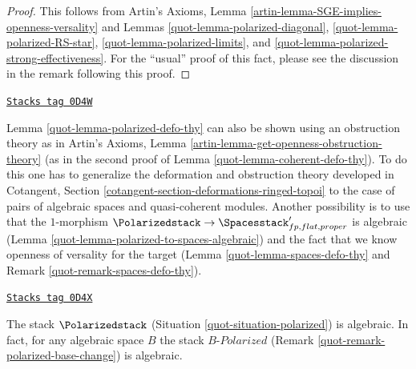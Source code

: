 \begin{proof}

This follows from
Artin's Axioms, Lemma \ref{artin-lemma-SGE-implies-openness-versality}
and Lemmas \ref{quot-lemma-polarized-diagonal},
\ref{quot-lemma-polarized-RS-star},
\ref{quot-lemma-polarized-limits}, and
\ref{quot-lemma-polarized-strong-effectiveness}.
For the ``usual'' proof of this fact, please see the discussion
in the remark following this proof.
\end{proof}

\begin{remark}
\label{quot-remark-polarized-defo-thy}
\href{https://stacks.math.columbia.edu/tag/0D4W}{\texttt{Stacks tag 0D4W}}

Lemma \ref{quot-lemma-polarized-defo-thy} can also be shown
using an obstruction theory as in
Artin's Axioms, Lemma \ref{artin-lemma-get-openness-obstruction-theory}
(as in the second proof of Lemma \ref{quot-lemma-coherent-defo-thy}).
To do this one has to generalize the deformation and obstruction theory
developed in
Cotangent, Section \ref{cotangent-section-deformations-ringed-topoi}
to the case of pairs of algebraic spaces and quasi-coherent modules.
Another possibility is to use that the $1$-morphism
$\Polarizedstack \to \Spacesstack'_{fp, flat, proper}$
is algebraic (Lemma \ref{quot-lemma-polarized-to-spaces-algebraic})
and the fact that we know openness of versality for the target
(Lemma \ref{quot-lemma-spaces-defo-thy} and
Remark \ref{quot-remark-spaces-defo-thy}).
\end{remark}

\begin{theorem}

\label{quot-theorem-polarized-algebraic}
\href{https://stacks.math.columbia.edu/tag/0D4X}{\texttt{Stacks tag 0D4X}}

The stack $\Polarizedstack$ (Situation \ref{quot-situation-polarized})
is algebraic. In fact, for any algebraic space $B$ the stack
$B\textit{-Polarized}$ (Remark \ref{quot-remark-polarized-base-change})
is algebraic.
\end{theorem}

